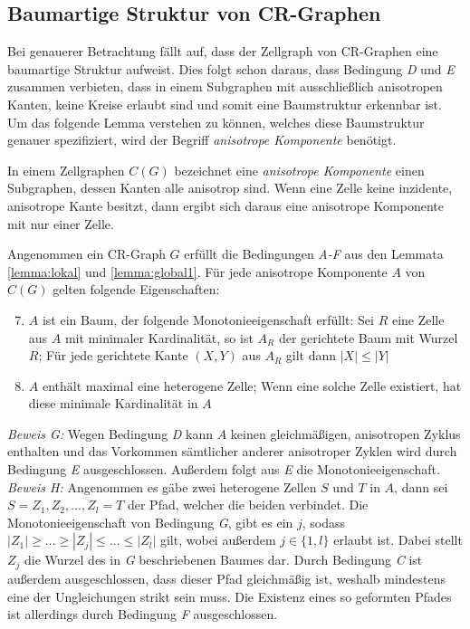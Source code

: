 \subsection{Baumartige Struktur von CR-Graphen}
Bei genauerer Betrachtung fällt auf, dass der Zellgraph von CR-Graphen eine baumartige Struktur aufweist.
Dies folgt schon daraus, dass Bedingung \emph{D} und \emph{E} zusammen verbieten, dass in einem Subgraphen mit ausschließlich anisotropen Kanten, keine Kreise erlaubt sind und somit eine Baumstruktur erkennbar ist.
Um das folgende Lemma verstehen zu können, welches diese Baumstruktur genauer spezifiziert, wird der Begriff \emph{anisotrope Komponente} benötigt.
\begin{Definition}
	In einem Zellgraphen $C(G)$ bezeichnet eine \emph{anisotrope Komponente} einen Subgraphen, dessen Kanten alle anisotrop sind.
	Wenn eine Zelle keine inzidente, anisotrope Kante besitzt, dann ergibt sich daraus eine anisotrope Komponente mit nur einer Zelle.
\end{Definition}

\begin{Lemma}
	Angenommen ein CR-Graph $G$ erfüllt die Bedingungen \emph{A-F} aus den Lemmata \ref{lemma:lokal} und \ref{lemma:global1}.
	Für jede anisotrope Komponente $A$ von $C(G)$ gelten folgende Eigenschaften:
	
	\begin{enumerate}[label=(\Alph*)]
		\setcounter{enumi}{6}
		\item $A$ ist ein Baum, der folgende Monotonieeigenschaft erfüllt: Sei $R$ eine Zelle aus $A$ mit minimaler Kardinalität, so ist $A_R$ der gerichtete Baum mit Wurzel $R$; Für jede gerichtete Kante $(X,Y)$ aus $A_R$ gilt dann $|X|\leq |Y|$
		\item $A$ enthält maximal eine heterogene Zelle; Wenn eine solche Zelle existiert, hat diese minimale Kardinalität in $A$
	\end{enumerate}
	\label{lemma:global2}
\end{Lemma}

\emph{Beweis G:} Wegen Bedingung \emph{D} kann $A$ keinen gleichmäßigen, anisotropen Zyklus enthalten und das Vorkommen sämtlicher anderer anisotroper Zyklen wird durch Bedingung \emph{E} ausgeschlossen. Außerdem folgt aus \emph{E} die Monotonieeigenschaft.\\

\emph{Beweis H:} Angenommen es gäbe zwei heterogene Zellen $S$ und $T$ in $A$, dann sei $S=Z_1,Z_2,...,Z_l=T$ der Pfad, welcher die beiden verbindet.
Die Monotonieeigenschaft von Bedingung \emph{G}, gibt es ein $j$, sodass $|Z_1|\geq ... \geq |Z_j|\leq ... \leq |Z_l|$ gilt, wobei außerdem $j\in \{1,l\}$ erlaubt ist.
Dabei stellt $Z_j$ die Wurzel des in \emph{G} beschriebenen Baumes dar.
Durch Bedingung \emph{C} ist außerdem ausgeschlossen, dass dieser Pfad gleichmäßig ist, weshalb mindestens eine der Ungleichungen strikt sein muss.
Die Existenz eines so geformten Pfades ist allerdings durch Bedingung \emph{F} ausgeschlossen.

